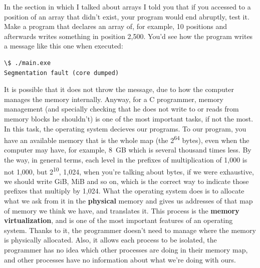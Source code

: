 \documentclass[a4paper]{article}
\begin{document}
In the section in which I talked about arrays I told you that if you accessed to
a position of an array that didn't exist, your program would end abruptly, test
it. Make a program that declares an array of, for example, 10 positions and
afterwards writes something in position 2,500. You'd see how the program writes
a message like this one when executed:

\noindent
\begin{minipage}[H]{\linewidth}
\mbox{}
\begin{lstlisting}[style=terminalStyle]
\$ ./main.exe
Segmentation fault (core dumped)
\end{lstlisting}
\end{minipage}

It is possible that it does not throw the message, due to how the computer
manages the memory internally. Anyway, for a C programmer, memory management
(and specially checking that he does not write to or reads from memory blocks he
shouldn't) is one of the most important tasks, if not the most. In this task,
the operating system decieves our programs. To our program, you have an
available memory that is the whole map (the 2\textsuperscript{64} bytes), even
when the computer may have, for example, 8~GB which is several thousand times
less. By the way, in general terms, each level in the prefixes of multiplication
of 1,000 is not 1,000, but 2\textsuperscript{10}, 1,024, when you're talking
about bytes, if we were exhaustive,
we should write GiB, MiB and so on, which is the correct way to indicate those
prefixes that multiply by 1,024. What the operating system does is to allocate
what we ask from it in the \textbf{physical} memory and gives us addresses of
that map of memory we think we have, and translates it. This process is the
\textbf{memory virtualization}, and is one of the most important features of an
operating system. Thanks to it, the programmer doesn't need to manage where the
memory is physically allocated. Also, it allows each process to be isolated,
the programmer has no idea which other processes are doing in their memory map,
and other processes have no information about what we're doing with ours.
\end{document}
